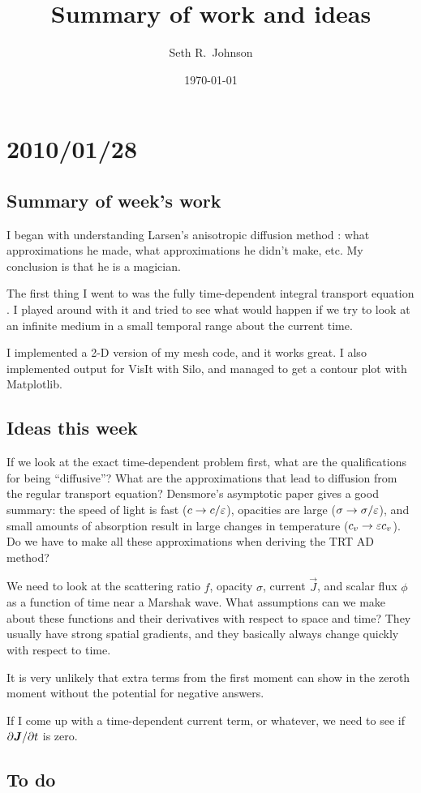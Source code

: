 \documentclass[11pt]{SRJresearch}
\author{Seth R.~Johnson}
\date{\today}
\title{Summary of work and ideas}
\begin{document}
\section{2010/01/28}
\subsection{Summary of week's work}
I began with understanding Larsen's anisotropic diffusion method
\cite{Lar2009c}: what approximations he made, what approximations he didn't
make, etc. My conclusion is that he is a magician.

The first thing I went to was the fully time-dependent integral transport
equation \cite{Pri2010}. I played around with it and tried to see what would
happen if we try to look at an infinite medium in a small temporal range about
the current time. 

I implemented a 2-D version of my mesh code, and it works great. I also
implemented output for VisIt with Silo, and managed to get a contour plot with
Matplotlib.

\subsection{Ideas this week}
If we look at the exact time-dependent problem first, what are the
qualifications for being ``diffusive''?  What are the approximations that lead
to diffusion from the regular transport equation? Densmore's asymptotic paper
\cite{Den2004} gives a good summary: the speed of light is fast ($c \to
c/\varepsilon$), opacities are large ($\sigma \to \sigma/\varepsilon$), and small amounts of
absorption result in large changes in temperature ($c_v \to \varepsilon c_v$). Do we
have to make all these approximations when deriving the TRT AD method?

We need to look at the scattering ratio $f$, opacity $\sigma$, current
$\vec{J}$, and scalar flux $\phi$ as a function of time near a Marshak wave.
What assumptions can we make about these functions and their derivatives with
respect to space and time? They usually have strong spatial gradients, and they
basically always change quickly with respect to time.

It is very unlikely that extra terms from the first moment can show in the
zeroth moment without the potential for negative answers.

If I come up with a time-dependent current term, or whatever, we need to see if
${\partial \bm{J}}/{\partial t}$ is zero.


\subsection{To do}



\end{document}
